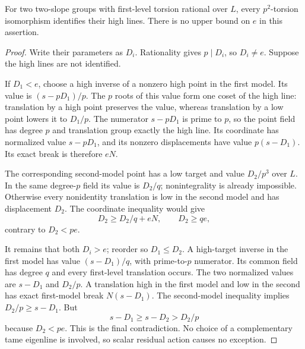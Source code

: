 \begin{lemma}\label{lem:rational-high-recovery}
For two two-slope groups with first-level torsion rational over $L$, every $p^2$-torsion isomorphism identifies their high lines. There is no upper bound on $e$ in this assertion.
\end{lemma}
\begin{proof}
Write their parameters as $D_i$. Rationality gives $p\mid D_i$, so $D_i\ne e$. Suppose the high lines are not identified.

If $D_1<e$, choose a high inverse of a nonzero high point in the first model. Its value is $(s-pD_1)/p$. The $p$ roots of this value form one coset of the high line: translation by a high point preserves the value, whereas translation by a low point lowers it to $D_1/p$. The numerator $s-pD_1$ is prime to $p$, so the point field has degree $p$ and translation group exactly the high line. Its coordinate has normalized value $s-pD_1$, and its nonzero displacements have value $p(s-D_1)$. Its exact break is therefore $eN$.

The corresponding second-model point has a low target and value $D_2/p^3$ over $L$. In the same degree-$p$ field its value is $D_2/q$; nonintegrality is already impossible. Otherwise every nonidentity translation is low in the second model and has displacement $D_2$. The coordinate inequality would give
\[
                  D_2\ge D_2/q+eN,
                  \qquad D_2\ge qe,
\]
contrary to $D_2<pe$.

It remains that both $D_i>e$; reorder so $D_1\le D_2$. A high-target inverse in the first model has value $(s-D_1)/q$, with prime-to-$p$ numerator. Its common field has degree $q$ and every first-level translation occurs. The two normalized values are $s-D_1$ and $D_2/p$. A translation high in the first model and low in the second has exact first-model break $N(s-D_1)$. The second-model inequality implies $D_2/p\ge s-D_1$. But
\[
                    s-D_1\ge s-D_2>D_2/p
\]
because $D_2<pe$. This is the final contradiction. No choice of a complementary tame eigenline is involved, so scalar residual action causes no exception.
\end{proof}

